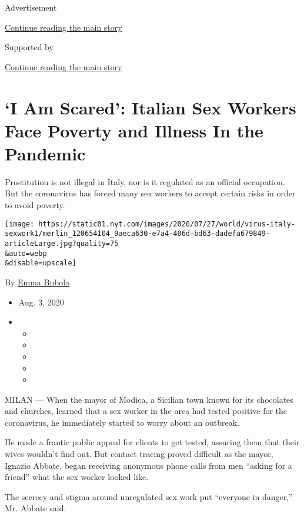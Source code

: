 Advertisement

\protect\hyperlink{after-top}{Continue reading the main story}

Supported by

\protect\hyperlink{after-sponsor}{Continue reading the main story}

\hypertarget{i-am-scared-italian-sex-workers-face-poverty-and-illness-in-the-pandemic}{%
\section{`I Am Scared': Italian Sex Workers Face Poverty and Illness In
the
Pandemic}\label{i-am-scared-italian-sex-workers-face-poverty-and-illness-in-the-pandemic}}

Prostitution is not illegal in Italy, nor is it regulated as an official
occupation. But the coronavirus has forced many sex workers to accept
certain risks in order to avoid poverty.

\texttt{[image: https://static01.nyt.com/images/2020/07/27/world/virus-italy-sexwork1/merlin\_120654104\_9aeca630-e7a4-406d-bd63-dadefa679849-articleLarge.jpg?quality=75\\\&auto=webp\\\&disable=upscale]}

By \href{https://www.nytimes.com/by/emma-bubola}{Emma Bubola}

\begin{itemize}
\item
  Aug. 3, 2020
\item
  \begin{itemize}
  \item
  \item
  \item
  \item
  \item
  \end{itemize}
\end{itemize}

MILAN --- When the mayor of Modica, a Sicilian town known for its
chocolates and churches, learned that a sex worker in the area had
tested positive for the coronavirus, he immediately started to worry
about an outbreak.

He made a frantic public appeal for clients to get tested, assuring them
that their wives wouldn't find out. But contact tracing proved difficult
as the mayor, Ignazio Abbate, began receiving anonymous phone calls from
men ``asking for a friend'' what the sex worker looked like.

The secrecy and stigma around unregulated sex work put ``everyone in
danger,'' Mr. Abbate said.

